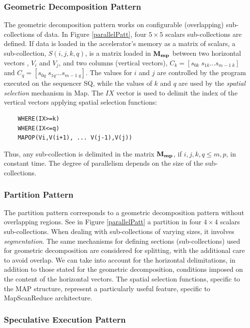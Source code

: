\subsubsection{Geometric Decomposition  Pattern}

The geometric decomposition pattern works on configurable (overlapping) sub-collections  of data. In Figure \ref{parallelPatt}, four $5 \times 5$ scalars sub-collections are defined. If data is loaded in the accelerator's memory as a matrix of scalars, a sub-collection, $S(i,j,k,q)$, is a matrix loaded in ${\bf M_{mp}}$ between two horizontal vectors , $V_i$ and $V_j$, and two columns (vertical vectors), $C_k = [s_{0k} \; s_{1k} \ldots s_{m-1 \; k}]$ and $C_q = [s_{0q} \; s_{1q} \ldots s_{m-1 \; q}]$. The values for $i$ and $j$ are controlled by the program executed on the sequencer SQ, while the values of $k$ and $q$ are used by the {\em spatial selection} mechanism in Map. The $IX$ vector is used to delimit the index  of the vertical vectors applying spatial selection functions:
\begin{verbatim}
    WHERE(IX>=k)
    WHERE(IX<=q)
    MAPOP(Vi,V(i+1), ... V(j-1),V(j))
\end{verbatim}
Thus, any sub-collection is delimited in the matrix ${\bf M_{mp}}$, if $i,j,k,q \leq m,p$, in constant time. The degree of parallelism depends on the size of the sub-collections.

\subsubsection{Partition  Pattern}

The partition pattern corresponds to a geometric decomposition pattern without overlapping regions. See in Figure \ref{parallelPatt} a partition in four $4 \times 4$ scalars sub-collections. When dealing with sub-collections of varying sizes, it involves  {\em segmentation}. The same mechanisms for defining sections (sub-collections) used for geometric decomposition are considered for splitting, with the additional care to avoid overlap. We can take into account for the horizontal delimitations, in addition to those stated for the geometric decomposition, conditions imposed on the content of the horizontal vectors. The spatial selection functions, specific to the MAP structure, represent a particularly useful feature, specific to MapScanReduce architecture.

\subsubsection{Speculative Execution Pattern}


